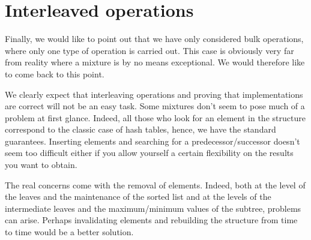 
\section{Interleaved operations}

Finally, we would like to point out that we have only considered bulk operations, where only one type of operation is carried out. This case is obviously very far from reality where a mixture is by no means exceptional. We would therefore like to come back to this point.

We clearly expect that interleaving operations and proving that implementations are correct will not be an easy task. Some mixtures don't seem to pose much of a problem at first glance. Indeed, all those who look for an element in the structure correspond to the classic case of hash tables, hence, we have the standard guarantees. Inserting elements and searching for a predecessor/successor doesn't seem too difficult either if you allow yourself a certain flexibility on the results you want to obtain.

The real concerns come with the removal of elements. Indeed, both at the level of the leaves and the maintenance of the sorted list and at the levels of the intermediate leaves and the maximum/minimum values of the subtree, problems can arise. Perhaps invalidating elements and rebuilding the structure from time to time would be a better solution.